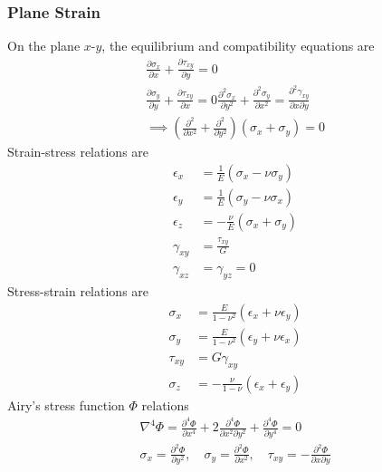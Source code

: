 \subsubsection*{Plane Strain}
On the plane $x$-$y$, the equilibrium and compatibility equations are
\begin{gather*}
    \frac{\partial \sigma_x}{\partial x} + \frac{\partial \tau_{xy}}{\partial y} = 0 \\
    \frac{\partial \sigma_y}{\partial y} + \frac{\partial \tau_{xy}}{\partial x} = 0
    \frac{\partial^2 \sigma_x}{\partial y^2} + \frac{\partial^2 \sigma_y}{\partial x^2} = \frac{\partial^2 \gamma_{xy}}{\partial x \partial y} \\
    \implies \left(\frac{\partial^2}{\partial x^2} + \frac{\partial^2}{\partial y^2}\right) (\sigma_x + \sigma_y) = 0
\end{gather*}
Strain-stress relations are
\begin{align*}
    \epsilon_x &= \frac{1}{E} \left( \sigma_x - \nu \sigma_y \right) \\
    \epsilon_y &= \frac{1}{E} \left( \sigma_y - \nu \sigma_x \right) \\
    \epsilon_z &= -\frac{\nu}{E} \left( \sigma_x + \sigma_y \right) \\
    \gamma_{xy} &= \frac{\tau_{xy}}{G} \\
    \gamma_{xz} &= \gamma_{yz} = 0 
\end{align*}
Stress-strain relations are
\begin{align*}
    \sigma_x &= \frac{E}{1-\nu^2} \left( \epsilon_x + \nu \epsilon_y \right) \\
    \sigma_y &= \frac{E}{1-\nu^2} \left( \epsilon_y + \nu \epsilon_x \right) \\
    \tau_{xy} &= G \gamma_{xy} \\
    \sigma_z &= -\frac{\nu}{1-\nu} \left( \epsilon_x + \epsilon_y \right)
\end{align*}
Airy's stress function $\Phi$ relations
\begin{gather*}
    \nabla^4 \Phi = \frac{\partial^4 \Phi}{\partial x^4} + 2 \frac{\partial^4 \Phi}{\partial x^2 \partial y^2} + \frac{\partial^4 \Phi}{\partial y^4} = 0\\
    \sigma_x = \frac{\partial^2 \Phi}{\partial y^2}, \quad \sigma_y = \frac{\partial^2 \Phi}{\partial x^2}, \quad \tau_{xy} = -\frac{\partial^2 \Phi}{\partial x \partial y}
\end{gather*}
